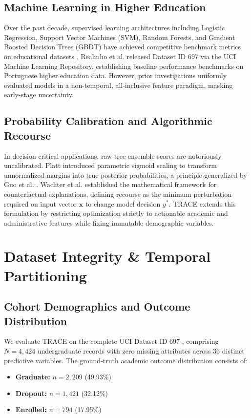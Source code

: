 \documentclass[conference]{IEEEtran}
\begin{document}
\subsection{Machine Learning in Higher Education}
Over the past decade, supervised learning architectures including Logistic Regression, Support Vector Machines (SVM), Random Forests, and Gradient Boosted Decision Trees (GBDT) have achieved competitive benchmark metrics on educational datasets \cite{romero2010educational, pedregosa2011scikit}. Realinho et al. \cite{realinho2021predict} released Dataset ID 697 via the UCI Machine Learning Repository, establishing baseline performance benchmarks on Portuguese higher education data. However, prior investigations uniformly evaluated models in a non-temporal, all-inclusive feature paradigm, masking early-stage uncertainty.

\subsection{Probability Calibration and Algorithmic Recourse}
In decision-critical applications, raw tree ensemble scores are notoriously uncalibrated. Platt \cite{platt1999probabilistic} introduced parametric sigmoid scaling to transform unnormalized margins into true posterior probabilities, a principle generalized by Guo et al. \cite{guo2017calibration}. Wachter et al. \cite{wachter2017counterfactual} established the mathematical framework for counterfactual explanations, defining recourse as the minimum perturbation required on input vector $\mathbf{x}$ to change model decision $y^*$. TRACE extends this formulation by restricting optimization strictly to actionable academic and administrative features while fixing immutable demographic variables.

\section{Dataset Integrity \& Temporal Partitioning}

\subsection{Cohort Demographics and Outcome Distribution}
We evaluate TRACE on the complete UCI Dataset ID 697 \cite{realinho2021predict}, comprising $N=4,424$ undergraduate records with zero missing attributes across 36 distinct predictive variables. The ground-truth academic outcome distribution consists of:
\begin{itemize}
    \item \textbf{Graduate:} $n = 2,209$ (49.93\%)
    \item \textbf{Dropout:} $n = 1,421$ (32.12\%)
    \item \textbf{Enrolled:} $n = 794$ (17.95\%)
\end{itemize}
\end{document}
